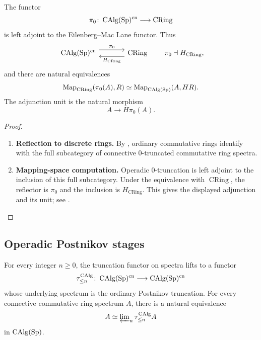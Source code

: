 \begin{proposition}
\label{prop:pi-zero-h-adjunction}
The functor
\[
    \pi_0
    \colon
    \operatorname{CAlg}(\operatorname{Sp})^{\mathrm{cn}}
    \longrightarrow
    \operatorname{CRing}
\]
is left adjoint to the Eilenberg--Mac Lane functor. Thus
\[
\begin{tikzcd}[column sep=large]
    \CAlg(\Sp)^{\mathrm{cn}}
        \arrow[r, shift left=1.1ex, "\pi_0"]
    &
    \operatorname{CRing}
        \arrow[l, swap, shift left=1.1ex, "H_{\mathrm{CRing}}"']
\end{tikzcd}
\qquad
\pi_0\dashv H_{\mathrm{CRing}},
\]
and there are natural equivalences
\[
    \operatorname{Map}_{\operatorname{CRing}}(\pi_0(A),R)
    \simeq
    \operatorname{Map}_{\operatorname{CAlg}(\operatorname{Sp})}(A,HR).
\]
The adjunction unit is the natural morphism
\[
    A\longrightarrow H\pi_0(A).
\]
\end{proposition}

\begin{proof}
\leavevmode
\begin{enumerate}[label=\textup{(\arabic*)}]
    \item \textbf{Reflection to discrete rings.}
    By , ordinary commutative
    rings identify with the full subcategory of connective \(0\)-truncated
    commutative ring spectra.

    \item \textbf{Mapping-space computation.}
    Operadic \(0\)-truncation is left adjoint to the inclusion of this full
    subcategory. Under the equivalence with \(\operatorname{CRing}\), the
    reflector is \(\pi_0\) and the inclusion is \(H_{\mathrm{CRing}}\). This gives the
    displayed adjunction and its unit; see \cite{LurieHigherAlgebra}.
\end{enumerate}
\end{proof}

\subsection{Operadic Postnikov stages}

\begin{proposition}
\label{prop:operadic-postnikov-truncations}
For every integer $n\geq0$, the truncation functor on spectra lifts to a
functor
\[
    \tau_{\leq n}^{\operatorname{CAlg}}
    \colon
    \operatorname{CAlg}(\operatorname{Sp})^{\mathrm{cn}}
    \longrightarrow
    \operatorname{CAlg}(\operatorname{Sp})^{\mathrm{cn}}
\]
whose underlying spectrum is the ordinary Postnikov truncation. For every
connective commutative ring spectrum $A$, there is a natural equivalence
\[
    A
    \simeq
    \varprojlim\nolimits_n\tau_{\leq n}^{\operatorname{CAlg}}A
\]
in $\operatorname{CAlg}(\operatorname{Sp})$.
\end{proposition}

